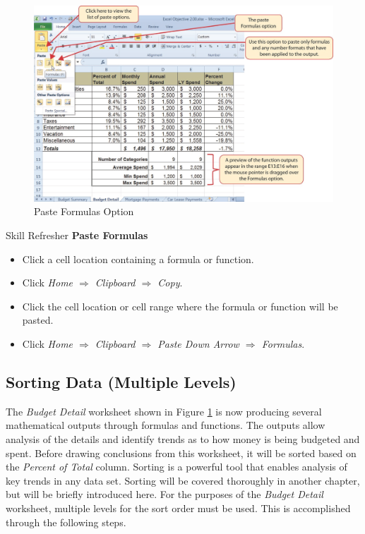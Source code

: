 \begin{figure}[H]
	\centering
	\includegraphics[width=\maxwidth{.95\linewidth}]{gfx/ch02_fig26}
	\caption{Paste Formulas Option}
	\label{02:fig26}
\end{figure}

\begin{center}
	\begin{sklbox}{Skill Refresher}
		\textbf{Paste Formulas}
		\\
		\begin{itemize}
			\setlength{\itemsep}{0pt}
			\setlength{\parskip}{0pt}
			\setlength{\parsep}{0pt}
			
			\item Click a cell location containing a formula or function.
			\item Click \textit{Home $ \Rightarrow $ Clipboard $ \Rightarrow $ Copy}.
			\item Click the cell location or cell range where the formula or function will be pasted.
			\item Click \textit{Home $ \Rightarrow $ Clipboard $ \Rightarrow $ Paste Down Arrow $ \Rightarrow $ Formulas}.
			
		\end{itemize}
	\end{sklbox}
\end{center}

\subsection{Sorting Data (Multiple Levels)}

The \textit{Budget Detail} worksheet shown in Figure \ref{02:fig26} is now producing several mathematical outputs through formulas and functions. The outputs allow analysis of the details and identify trends as to how money is being budgeted and spent. Before drawing conclusions from this worksheet, it will be sorted based on the \textit{Percent of Total} column. Sorting is a powerful tool that enables analysis of key trends in any data set. Sorting will be covered thoroughly in another chapter, but will be briefly introduced here. For the purposes of the \textit{Budget Detail} worksheet, multiple levels for the sort order must be used. This is accomplished through the following steps.

